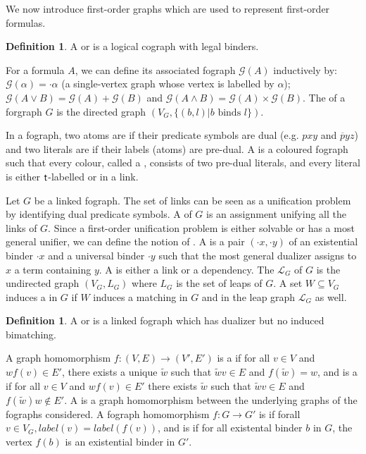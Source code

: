 \documentclass[conference]{IEEEtran}
\theoremstyle{definition}
\newtheorem{definition}[thm]{Definition}
\newcommand{\Gr}{\mathcal{G}}
\newcommand{\LG}{\mathcal{L}}
\begin{document}
We now introduce first-order graphs which are used to represent first-order formulas.

\begin{definition}
A  or  is a logical cograph with legal binders.
\end{definition}

For a formula $A$, we can define its associated fograph $\Gr(A)$ inductively by: $\Gr(\alpha) = \cdot \alpha$ (a single-vertex graph whose vertex is labelled by $\alpha$); $\Gr(A \vee B) = \Gr(A) + \Gr(B)$ and $\Gr(A \wedge B) = \Gr(A) \times \Gr(B)$.
The  of a forgraph $G$ is the directed graph $(V_G, \{(b,
l) | b \text{ binds } l\})$.

In a fograph, two atoms are  if their predicate symbols are dual
(e.g. $pxy$ and $\overline{p}yz$) and two literals are  if their
labels (atoms) are pre-dual. A  is a coloured fograph such
that every colour, called a , consists of two pre-dual literals, and
every literal is either ${\mathsf t}$-labelled or in a link.

Let $G$ be a linked fograph. The set of links can be seen as a unification problem
by identifying dual predicate symbols. A  of $G$ is an assignment
unifying all the links of $G$. Since a first-order unification problem is either
solvable or has a most general unifier, we can define the notion of . A  is a pair $(\cdot x, \cdot y)$ of an
existential binder $\cdot x$ and a universal binder $\cdot y$ such that the most
general dualizer assigns to $x$ a term containing $y$. A  is either a
link or a dependency. The  $\LG_G$ of $G$ is the undirected graph $(V_G,
L_G)$ where $L_G$ is the set of leaps of $G$. A set $W \subseteq V_G$ induces a
 in $G$ if $W$ induces a matching in $G$ and in the leap graph
$\LG_G$ as well.

\begin{definition}
A  or  is a linked fograph which has
dualizer but no induced bimatching.  
\end{definition}

A graph homomorphism $f: (V, E) \rightarrow (V', E')$ is a  if
for all $v \in V$ and $wf(v) \in E'$, there exists a unique $\tilde{w}$ such
that $\tilde{w}v \in E$ and $f(\tilde{w}) = w$, and is a 
if for all $v \in V$ and $wf(v) \in E'$ there exists $\tilde{w}$ such that
$\tilde{w}v \in E$ and $f(\tilde{w})w \notin E'$. A 
is a graph homomorphism between the underlying graphs of the fographs
considered. A fograph homomorphism $f : G \rightarrow G'$ is
 if forall $v \in V_G, label(v) = label(f(v))$, and is
 if for all existental binder $b$ in $G$, the
vertex $f(b)$ is an existential binder in $G'$.
\end{document}
